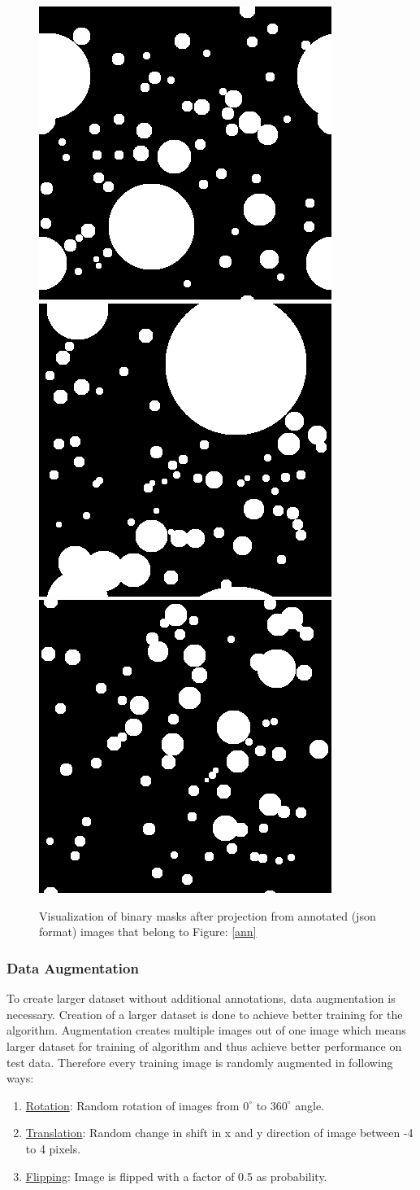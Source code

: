 \documentclass[11pt]{article}
\begin{document}
\begin{figure}[ht!]
	\includegraphics[width=.3\textwidth]{files/annotation/66m.png}\hfill
	\includegraphics[width=.3\textwidth]{files/annotation/29m.png}\hfill
	\includegraphics[width=.3\textwidth]{files/annotation/20m.png}
	\caption{Visualization of binary masks after projection from annotated (json format) images that belong to Figure: \ref{ann}}
	\label{mask}
\end{figure}

\subsubsection{Data Augmentation}
To create larger dataset without additional annotations, data augmentation is necessary. Creation of a larger dataset is done to achieve better training for the algorithm. Augmentation creates multiple images out of one image which means larger dataset for training of algorithm and thus achieve better performance on test data. Therefore every training image is randomly augmented in following ways:

\begin{enumerate}
\item \underline{Rotation}: Random rotation of images from $0^{\circ}$ to $360^{\circ}$ angle.
\item \underline{Translation}: Random change in shift in x and y direction of image between -4 to 4 pixels.
\item \underline{Flipping}: Image is flipped with a factor of 0.5 as probability. 
\end{enumerate}
\end{document}
